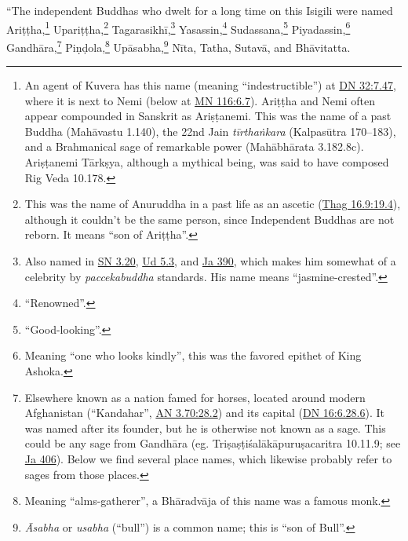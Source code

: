 \documentclass[12pt,openany]{book}%
\begin{document}
“The independent Buddhas who dwelt for a long time on this Isigili were named \textsanskrit{Ariṭṭha},\footnote{An agent of Kuvera has this name (meaning “indestructible”) at \href{https://suttacentral.net/dn32/en/sujato\#7.47}{DN 32:7.47}, where it is next to Nemi (below at \href{https://suttacentral.net/mn116/en/sujato\#6.7}{MN 116:6.7}). \textsanskrit{Ariṭṭha} and Nemi often appear compounded in Sanskrit as \textsanskrit{Ariṣṭanemi}. This was the name of a past Buddha (\textsanskrit{Mahāvastu} 1.140), the 22nd Jain \textit{\textsanskrit{tīrthaṅkara}} (\textsanskrit{Kalpasūtra} 170–183), and a Brahmanical sage of remarkable power (\textsanskrit{Mahābhārata} 3.182.8c). \textsanskrit{Ariṣṭanemi} \textsanskrit{Tārkṣya}, although a mythical being, was said to have composed Rig Veda 10.178. } \textsanskrit{Upariṭṭha},\footnote{This was the name of Anuruddha in a past life as an ascetic (\href{https://suttacentral.net/thag16.9/en/sujato\#19.4}{Thag 16.9:19.4}), although it couldn’t be the same person, since Independent Buddhas are not reborn. It means “son of \textsanskrit{Ariṭṭha}”. } \textsanskrit{Tagarasikhī},\footnote{Also named in \href{https://suttacentral.net/sn3.20/en/sujato}{SN 3.20}, \href{https://suttacentral.net/ud5.3/en/sujato}{Ud 5.3}, and \href{https://suttacentral.net/ja390/en/sujato}{Ja 390}, which makes him somewhat of a celebrity by \textit{paccekabuddha} standards. His name means “jasmine-crested”. } Yasassin,\footnote{“Renowned”. } Sudassana,\footnote{“Good-looking”. } Piyadassin,\footnote{Meaning “one who looks kindly”, this was the favored epithet of King Ashoka. } \textsanskrit{Gandhāra},\footnote{Elsewhere known as a nation famed for horses, located around modern Afghanistan (“Kandahar”, \href{https://suttacentral.net/an3.70/en/sujato\#28.2}{AN 3.70:28.2}) and its capital (\href{https://suttacentral.net/dn16/en/sujato\#6.28.6}{DN 16:6.28.6}). It was named after its founder, but he is otherwise not known as a sage. This could be any sage from \textsanskrit{Gandhāra} (eg. \textsanskrit{Triṣaṣṭiśalākāpuruṣacaritra} 10.11.9; see \href{https://suttacentral.net/ja406/en/sujato}{Ja 406}). Below we find several place names, which likewise probably refer to sages from those places. } \textsanskrit{Piṇḍola},\footnote{Meaning “alms-gatherer”, a \textsanskrit{Bhāradvāja} of this name was a famous monk. } \textsanskrit{Upāsabha},\footnote{\textit{Āsabha} or \textit{usabha} (“bull”) is a common name; this is “son of Bull”. } \textsanskrit{Nīta}, Tatha, \textsanskrit{Sutavā}, and \textsanskrit{Bhāvitatta}. 
\end{document}
